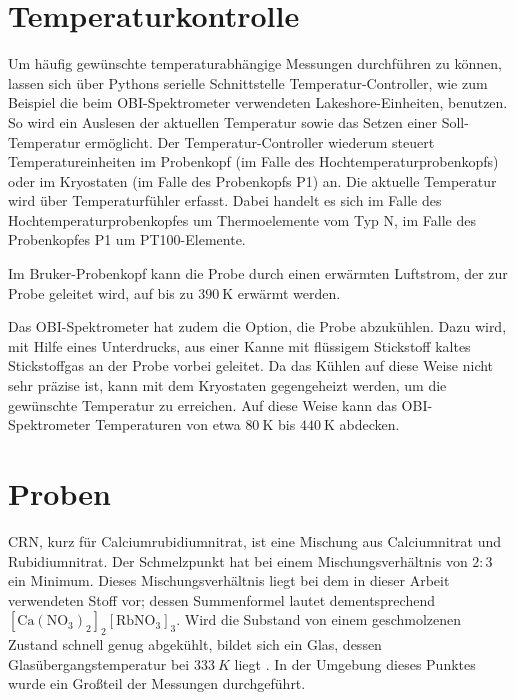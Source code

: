\section{Temperaturkontrolle} \label{section:exp:temperaturkontrolle}

Um häufig gewünschte temperaturabhängige Messungen durchführen zu können, lassen sich über Pythons serielle Schnittstelle Temperatur-Controller, wie zum Beispiel die beim OBI-Spektrometer verwendeten Lakeshore-Einheiten, benutzen. So wird ein Auslesen der aktuellen Temperatur sowie das Setzen einer Soll-Temperatur ermöglicht. Der Temperatur-Controller wiederum steuert Temperatureinheiten im Probenkopf (im Falle des Hochtemperaturprobenkopfs) oder im Kryostaten (im Falle des Probenkopfs P1) an. Die aktuelle Temperatur wird über Temperaturfühler erfasst. Dabei handelt es sich im Falle des Hochtemperaturprobenkopfes um Thermoelemente vom Typ N, im Falle des Probenkopfes P1 um PT100-Elemente.

Im Bruker-Probenkopf kann die Probe durch einen erwärmten Luftstrom, der zur Probe geleitet wird, auf bis zu $\SI{390}{\kelvin}$ erwärmt werden. 

Das OBI-Spektrometer hat zudem die Option, die Probe abzukühlen. Dazu wird, mit Hilfe eines Unterdrucks, aus einer Kanne mit flüssigem Stickstoff kaltes Stickstoffgas an der Probe vorbei geleitet. Da das Kühlen auf diese Weise nicht sehr präzise ist, kann mit dem Kryostaten gegengeheizt werden, um die gewünschte Temperatur zu erreichen. Auf diese Weise kann das OBI-Spektrometer Temperaturen von etwa $\SI{80}{\kelvin}$ bis $\SI{440}{\kelvin}$ abdecken.




\section{Proben} \label{section:exp:proben}


CRN, kurz für Calciumrubidiumnitrat, ist eine Mischung aus Calciumnitrat und Rubidiumnitrat. Der Schmelzpunkt hat bei einem Mischungsverhältnis von $2 : 3$ ein Minimum. Dieses Mischungsverhältnis liegt bei dem in dieser Arbeit verwendeten Stoff vor; dessen Summenformel lautet dementsprechend $[\text{Ca}(\text{NO}_\text{3})_\text{2}]_\text{2}[\text{RbNO}_\text{3}]_\text{3}$. Wird die Substand von einem geschmolzenen Zustand schnell genug abgekühlt, bildet sich ein Glas, dessen Glasübergangstemperatur bei $\SI{333}{K}$ liegt \cite{PIMENOV199793}. In der Umgebung dieses Punktes wurde ein Großteil der Messungen durchgeführt.

